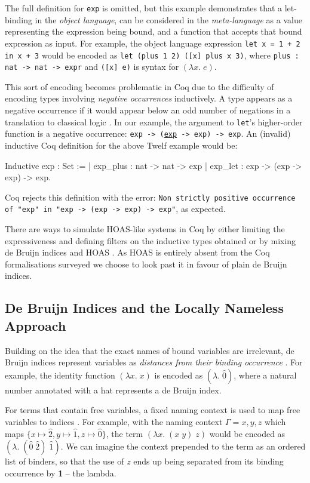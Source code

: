 \documentclass[]{unswthesis}
\let\c\texttt
\let\i\textit
\let\b\textbf
\begin{document}
The full definition for \c{exp} is omitted, but this example demonstrates that a let-binding in the \i{object language}, can be considered in the \i{meta-language} as a value representing the expression being bound, and a function that accepts that bound expression as input. For example, the object language expression \c{let x = 1 + 2 in x + 3} would be encoded as \c{let (plus 1 2) ([x] plus x 3)}, where \c{plus : nat -> nat -> expr} and \c{([x] e)} is syntax for $(\lambda x. \; e)$.

This sort of encoding becomes problematic in Coq due to the difficulty of encoding types involving \i{negative occurrences} inductively. A type appears as a negative occurrence if it would appear below an odd number of negations in a translation to classical logic \cite{tapl}. In our example, the argument to \c{let}'s higher-order function is a negative occurrence: \c{exp -> (\underline{exp} -> exp) -> exp}. An (invalid) inductive Coq definition for the above Twelf example would be:
\begin{coqcode}
Inductive exp : Set :=
  | exp_plus : nat -> nat -> exp
  | exp_let : exp -> (exp -> exp) -> exp.
\end{coqcode}

Coq rejects this definition with the error: \c{Non strictly positive occurrence of "exp" in
 "exp -> (exp -> exp) -> exp"}, as expected.

There are ways to simulate HOAS-like systems in Coq by either limiting the expressiveness and defining filters on the inductive types obtained \cite{despeyroux95} or by mixing de Bruijn indices and HOAS \cite{capretta07}. As HOAS is entirely absent from the Coq formalisations surveyed we choose to look past it in favour of plain de Bruijn indices.

\subsection{De Bruijn Indices and the Locally Nameless Approach}
\label{sec:de-bruijn}

Building on the idea that the exact names of bound variables are irrelevant, de Bruijn indices represent variables as \i{distances from their binding occurrence} \cite{deBruijn72}. For example, the identity function $(\lambda x. \; x)$ is encoded as $(\lambda . \; \hat{0})$, where a natural number annotated with a hat represents a de Bruijn index.

For terms that contain free variables, a fixed naming context is used to map free variables to indices \cite{tapl}. For example, with the naming context $\Gamma = x, y, z$ which maps $\{x \mapsto \hat{2}, y \mapsto \hat{1}, z \mapsto \hat{0}\}$, the term $(\lambda x. \; (x \; y) \; z)$ would be encoded as $(\lambda. \; (\hat{0} \; \hat{2}) \; \hat{1})$. We can imagine the context prepended to the term as an ordered list of binders, so that the use of $z$ ends up being separated from its binding occurrence by \b{1} -- the lambda.
\end{document}
